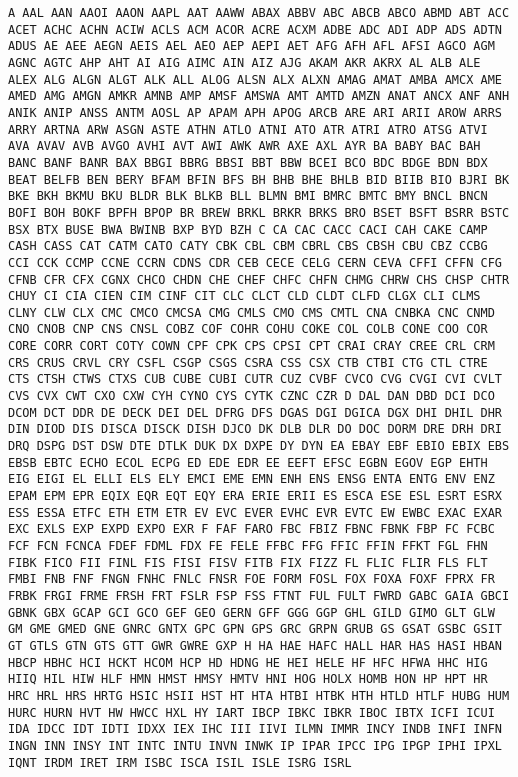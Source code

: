 \documentclass[11pt]{article}
\begin{document}
    \begin{Verbatim}[commandchars=\\\{\}]
A AAL AAN AAOI AAON AAPL AAT AAWW ABAX ABBV ABC ABCB ABCO ABMD ABT ACC ACET ACHC ACHN ACIW ACLS ACM ACOR ACRE ACXM ADBE ADC ADI ADP ADS ADTN ADUS AE AEE AEGN AEIS AEL AEO AEP AEPI AET AFG AFH AFL AFSI AGCO AGM AGNC AGTC AHP AHT AI AIG AIMC AIN AIZ AJG AKAM AKR AKRX AL ALB ALE ALEX ALG ALGN ALGT ALK ALL ALOG ALSN ALX ALXN AMAG AMAT AMBA AMCX AME AMED AMG AMGN AMKR AMNB AMP AMSF AMSWA AMT AMTD AMZN ANAT ANCX ANF ANH ANIK ANIP ANSS ANTM AOSL AP APAM APH APOG ARCB ARE ARI ARII AROW ARRS ARRY ARTNA ARW ASGN ASTE ATHN ATLO ATNI ATO ATR ATRI ATRO ATSG ATVI AVA AVAV AVB AVGO AVHI AVT AWI AWK AWR AXE AXL AYR BA BABY BAC BAH BANC BANF BANR BAX BBGI BBRG BBSI BBT BBW BCEI BCO BDC BDGE BDN BDX BEAT BELFB BEN BERY BFAM BFIN BFS BH BHB BHE BHLB BID BIIB BIO BJRI BK BKE BKH BKMU BKU BLDR BLK BLKB BLL BLMN BMI BMRC BMTC BMY BNCL BNCN BOFI BOH BOKF BPFH BPOP BR BREW BRKL BRKR BRKS BRO BSET BSFT BSRR BSTC BSX BTX BUSE BWA BWINB BXP BYD BZH C CA CAC CACC CACI CAH CAKE CAMP CASH CASS CAT CATM CATO CATY CBK CBL CBM CBRL CBS CBSH CBU CBZ CCBG CCI CCK CCMP CCNE CCRN CDNS CDR CEB CECE CELG CERN CEVA CFFI CFFN CFG CFNB CFR CFX CGNX CHCO CHDN CHE CHEF CHFC CHFN CHMG CHRW CHS CHSP CHTR CHUY CI CIA CIEN CIM CINF CIT CLC CLCT CLD CLDT CLFD CLGX CLI CLMS CLNY CLW CLX CMC CMCO CMCSA CMG CMLS CMO CMS CMTL CNA CNBKA CNC CNMD CNO CNOB CNP CNS CNSL COBZ COF COHR COHU COKE COL COLB CONE COO COR CORE CORR CORT COTY COWN CPF CPK CPS CPSI CPT CRAI CRAY CREE CRL CRM CRS CRUS CRVL CRY CSFL CSGP CSGS CSRA CSS CSX CTB CTBI CTG CTL CTRE CTS CTSH CTWS CTXS CUB CUBE CUBI CUTR CUZ CVBF CVCO CVG CVGI CVI CVLT CVS CVX CWT CXO CXW CYH CYNO CYS CYTK CZNC CZR D DAL DAN DBD DCI DCO DCOM DCT DDR DE DECK DEI DEL DFRG DFS DGAS DGI DGICA DGX DHI DHIL DHR DIN DIOD DIS DISCA DISCK DISH DJCO DK DLB DLR DO DOC DORM DRE DRH DRI DRQ DSPG DST DSW DTE DTLK DUK DX DXPE DY DYN EA EBAY EBF EBIO EBIX EBS EBSB EBTC ECHO ECOL ECPG ED EDE EDR EE EEFT EFSC EGBN EGOV EGP EHTH EIG EIGI EL ELLI ELS ELY EMCI EME EMN ENH ENS ENSG ENTA ENTG ENV ENZ EPAM EPM EPR EQIX EQR EQT EQY ERA ERIE ERII ES ESCA ESE ESL ESRT ESRX ESS ESSA ETFC ETH ETM ETR EV EVC EVER EVHC EVR EVTC EW EWBC EXAC EXAR EXC EXLS EXP EXPD EXPO EXR F FAF FARO FBC FBIZ FBNC FBNK FBP FC FCBC FCF FCN FCNCA FDEF FDML FDX FE FELE FFBC FFG FFIC FFIN FFKT FGL FHN FIBK FICO FII FINL FIS FISI FISV FITB FIX FIZZ FL FLIC FLIR FLS FLT FMBI FNB FNF FNGN FNHC FNLC FNSR FOE FORM FOSL FOX FOXA FOXF FPRX FR FRBK FRGI FRME FRSH FRT FSLR FSP FSS FTNT FUL FULT FWRD GABC GAIA GBCI GBNK GBX GCAP GCI GCO GEF GEO GERN GFF GGG GGP GHL GILD GIMO GLT GLW GM GME GMED GNE GNRC GNTX GPC GPN GPS GRC GRPN GRUB GS GSAT GSBC GSIT GT GTLS GTN GTS GTT GWR GWRE GXP H HA HAE HAFC HALL HAR HAS HASI HBAN HBCP HBHC HCI HCKT HCOM HCP HD HDNG HE HEI HELE HF HFC HFWA HHC HIG HIIQ HIL HIW HLF HMN HMST HMSY HMTV HNI HOG HOLX HOMB HON HP HPT HR HRC HRL HRS HRTG HSIC HSII HST HT HTA HTBI HTBK HTH HTLD HTLF HUBG HUM HURC HURN HVT HW HWCC HXL HY IART IBCP IBKC IBKR IBOC IBTX ICFI ICUI IDA IDCC IDT IDTI IDXX IEX IHC III IIVI ILMN IMMR INCY INDB INFI INFN INGN INN INSY INT INTC INTU INVN INWK IP IPAR IPCC IPG IPGP IPHI IPXL IQNT IRDM IRET IRM ISBC ISCA ISIL ISLE ISRG ISRL 
\end{Verbatim}
\end{document}
